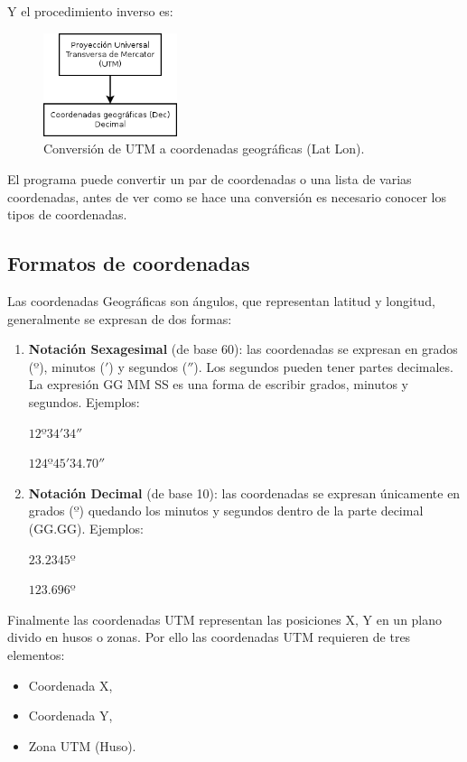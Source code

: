 \documentclass[12pt, letterpaper]{article}
\begin{document}
Y el procedimiento inverso es:

\begin{figure}[h]
    \centering
    \includegraphics[width=0.35\textwidth]{img/utm2geo.png}
    \caption{Conversión de UTM a coordenadas geográficas (Lat Lon).}
    \label{fig:utm2geo}
\end{figure}

El programa puede convertir un par de coordenadas o una lista de varias coordenadas, antes de ver como se hace una conversión es necesario conocer los tipos de coordenadas.

\subsection{Formatos de coordenadas}

Las coordenadas Geográficas son ángulos, que representan latitud y longitud, generalmente se expresan de dos formas:

\begin{enumerate}
\item \textbf{Notación Sexagesimal} (de base 60): las coordenadas se expresan en grados ($º$), minutos ($'$) y segundos ($''$). Los segundos pueden tener partes decimales. La expresión GG MM SS es una forma de escribir grados, minutos y segundos. Ejemplos:

$12º34'34''$

$124º45'34.70''$

\item \textbf{Notación Decimal} (de base 10): las coordenadas se expresan únicamente en grados ($º$) quedando los minutos y segundos dentro de la parte decimal (GG.GG). Ejemplos:

$23.2345º$

$123.696º$

\end{enumerate}

Finalmente las coordenadas UTM representan las posiciones X, Y en un plano divido en husos o zonas. Por ello las coordenadas UTM requieren de tres elementos:

\begin{itemize}
\item Coordenada X, 
\item Coordenada Y, 
\item Zona UTM (Huso).
\end{itemize}
\end{document}
